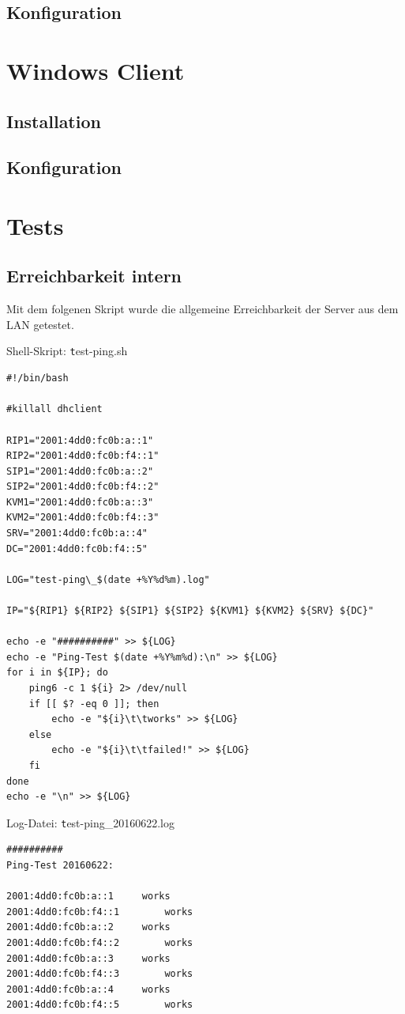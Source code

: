 \subsection{Konfiguration}\section{Windows Client}

\subsection{Installation}
\subsection{Konfiguration}\section{Tests}

\subsection{Erreichbarkeit intern}

Mit dem folgenen Skript wurde die allgemeine Erreichbarkeit der Server aus dem LAN getestet.

Shell-Skript: {\texttt test-ping.sh}
\begin{lstlisting}
#!/bin/bash

#killall dhclient

RIP1="2001:4dd0:fc0b:a::1"
RIP2="2001:4dd0:fc0b:f4::1"
SIP1="2001:4dd0:fc0b:a::2"
SIP2="2001:4dd0:fc0b:f4::2"
KVM1="2001:4dd0:fc0b:a::3"
KVM2="2001:4dd0:fc0b:f4::3"
SRV="2001:4dd0:fc0b:a::4"
DC="2001:4dd0:fc0b:f4::5"

LOG="test-ping\_$(date +%Y%d%m).log"

IP="${RIP1} ${RIP2} ${SIP1} ${SIP2} ${KVM1} ${KVM2} ${SRV} ${DC}"

echo -e "##########" >> ${LOG}
echo -e "Ping-Test $(date +%Y%m%d):\n" >> ${LOG}
for i in ${IP}; do
	ping6 -c 1 ${i} 2> /dev/null
	if [[ $? -eq 0 ]]; then
		echo -e "${i}\t\tworks" >> ${LOG}
	else
		echo -e "${i}\t\tfailed!" >> ${LOG}
	fi
done	
echo -e "\n" >> ${LOG}
\end{lstlisting}

Log-Datei: {\texttt test-ping\_20160622.log}
\begin{lstlisting}
##########
Ping-Test 20160622:

2001:4dd0:fc0b:a::1		works
2001:4dd0:fc0b:f4::1		works
2001:4dd0:fc0b:a::2		works
2001:4dd0:fc0b:f4::2		works
2001:4dd0:fc0b:a::3		works
2001:4dd0:fc0b:f4::3		works
2001:4dd0:fc0b:a::4		works
2001:4dd0:fc0b:f4::5		works
\end{lstlisting}

